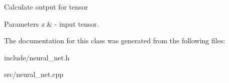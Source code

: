 Calculate output for tensor 
\begin{DoxyParams}{Parameters}
{\em x} & -\/ input tensor. \\
\hline
\end{DoxyParams}


The documentation for this class was generated from the following files\+:\begin{DoxyCompactItemize}
\item 
include/neural\+\_\+net.\+h\item 
src/neural\+\_\+net.\+cpp\end{DoxyCompactItemize}

